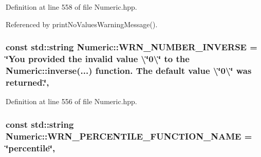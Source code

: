 Definition at line 558 of file Numeric.\-hpp.



Referenced by print\-No\-Values\-Warning\-Message().

\hypertarget{classmultiscale_1_1Numeric_ac1e4755ec54d2c04217d0d1f4b5d346b}{
\subsubsection[{W\-R\-N\-\_\-\-N\-U\-M\-B\-E\-R\-\_\-\-I\-N\-V\-E\-R\-S\-E}]{\setlength{\rightskip}{0pt plus 5cm}const std\-::string Numeric\-::\-W\-R\-N\-\_\-\-N\-U\-M\-B\-E\-R\-\_\-\-I\-N\-V\-E\-R\-S\-E = \char`\"{}You provided the invalid value \textbackslash{}\char`\"{}0\textbackslash{}\char`\"{} to the Numeric\-::inverse(...) function. The default value \textbackslash{}\char`\"{}0\textbackslash{}\char`\"{} was returned.\char`\"{}\hspace{0.3cm}{\ttfamily [static]}, {\ttfamily [private]}}}\label{classmultiscale_1_1Numeric_ac1e4755ec54d2c04217d0d1f4b5d346b}


Definition at line 556 of file Numeric.\-hpp.

\hypertarget{classmultiscale_1_1Numeric_a8d81f8548808bc79d7a63913866d848f}{
\subsubsection[{W\-R\-N\-\_\-\-P\-E\-R\-C\-E\-N\-T\-I\-L\-E\-\_\-\-F\-U\-N\-C\-T\-I\-O\-N\-\_\-\-N\-A\-M\-E}]{\setlength{\rightskip}{0pt plus 5cm}const std\-::string Numeric\-::\-W\-R\-N\-\_\-\-P\-E\-R\-C\-E\-N\-T\-I\-L\-E\-\_\-\-F\-U\-N\-C\-T\-I\-O\-N\-\_\-\-N\-A\-M\-E = \char`\"{}percentile\char`\"{}\hspace{0.3cm}{\ttfamily [static]}, {\ttfamily [private]}}}\label{classmultiscale_1_1Numeric_a8d81f8548808bc79d7a63913866d848f}


